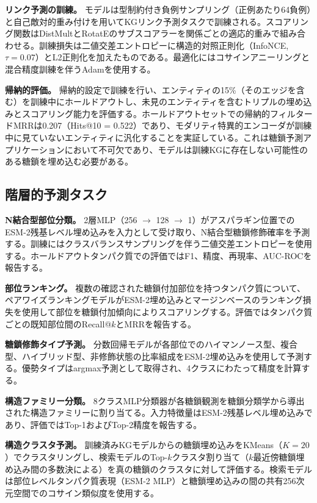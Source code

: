 \documentclass[11pt,a4paper]{ltjsarticle}
\begin{document}
\textbf{リンク予測の訓練。}
モデルは型制約付き負例サンプリング（正例あたり64負例）と自己敵対的重み付けを用いてKGリンク予測タスクで訓練される。スコアリング関数はDistMultとRotatEのサブスコアラーを関係ごとの適応的重みで組み合わせる。訓練損失は二値交差エントロピーに構造的対照正則化（InfoNCE, $\tau = 0.07$）とL2正則化を加えたものである。最適化にはコサインアニーリングと混合精度訓練を伴うAdamを使用する。

\textbf{帰納的評価。}
帰納的設定で訓練を行い、エンティティの15\%（そのエッジを含む）を訓練中にホールドアウトし、未見のエンティティを含むトリプルの埋め込みとスコアリング能力を評価する。ホールドアウトセットでの帰納的フィルタードMRRは0.207（Hits@10 = 0.522）であり、モダリティ特異的エンコーダが訓練中に見ていないエンティティに汎化することを実証している。これは糖鎖予測アプリケーションにおいて不可欠であり、モデルは訓練KGに存在しない可能性のある糖鎖を埋め込む必要がある。

\subsection{階層的予測タスク}

\textbf{N結合型部位分類。}
2層MLP（256 $\to$ 128 $\to$ 1）がアスパラギン位置でのESM-2残基レベル埋め込みを入力として受け取り、N結合型糖鎖修飾確率を予測する。訓練にはクラスバランスサンプリングを伴う二値交差エントロピーを使用する。ホールドアウトタンパク質での評価ではF1、精度、再現率、AUC-ROCを報告する。

\textbf{部位ランキング。}
複数の確認された糖鎖付加部位を持つタンパク質について、ペアワイズランキングモデルがESM-2埋め込みとマージンベースのランキング損失を使用して部位を糖鎖付加傾向によりスコアリングする。評価ではタンパク質ごとの既知部位間のRecall@$k$とMRRを報告する。

\textbf{糖鎖修飾タイプ予測。}
分数回帰モデルが各部位でのハイマンノース型、複合型、ハイブリッド型、非修飾状態の比率組成をESM-2埋め込みを使用して予測する。優勢タイプはargmax予測として取得され、4クラスにわたって精度を計算する。

\textbf{構造ファミリー分類。}
8クラスMLP分類器が各糖鎖観測を糖鎖分類学から導出された構造ファミリーに割り当てる。入力特徴量はESM-2残基レベル埋め込みであり、評価ではTop-1およびTop-2精度を報告する。

\textbf{構造クラスタ予測。}
訓練済みKGモデルからの糖鎖埋め込みをKMeans（$K = 20$）でクラスタリングし、検索モデルのTop-$k$クラスタ割り当て（$k$最近傍糖鎖埋め込み間の多数決による）を真の糖鎖のクラスタに対して評価する。検索モデルは部位レベルタンパク質表現（ESM-2 MLP）と糖鎖埋め込みの間の共有256次元空間でのコサイン類似度を使用する。
\end{document}
